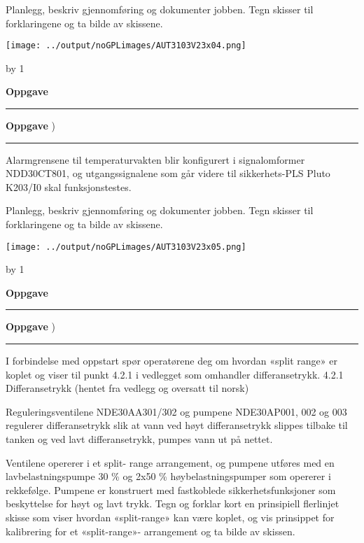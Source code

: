 \documentclass[12pt,a4paper]{article}
\def\oppgave{
            \advance\questnum by 1
	    \ifthenelse{\questnum>0\AND \questnum<9}
	    {
                \vskip 1cm
		\textbf{Oppgave}\hskip 5pt\the\questnum \hfill \hfill
		\vskip 3pt
		\hrule
	\vskip 0.5cm}
	{
                \vskip 1cm
		\textbf{Oppgave}\hskip 5pt \the\questnum \hfill \hfill)
		\vskip 3pt \hrule \vskip 0.5cm }

		}
\begin{document}
\vskip 0.25cm
Planlegg, beskriv gjennomføring og dokumenter jobben. Tegn skisser til forklaringene og ta bilde av skissene.


\vskip 0.25cm
\texttt{[image: ../output/noGPLimages/AUT3103V23x04.png]}\\
\newpage
\oppgave{}%
Alarmgrensene til temperaturvakten blir konfigurert i signalomformer NDD30CT801, og utgangssignalene som går videre til sikkerhets-PLS Pluto K203/I0 skal funksjonstestes. 

\vskip 0.25cm
Planlegg, beskriv gjennomføring og dokumenter jobben. Tegn skisser til forklaringene og ta bilde av skissene.


\vskip 0.25cm
\texttt{[image: ../output/noGPLimages/AUT3103V23x05.png]}\\
\newpage
\oppgave{}%
I forbindelse med oppstart spør operatørene deg om hvordan «split range» er koplet og viser til punkt 4.2.1 i vedlegget som omhandler differansetrykk.
\vskip 0.25cm
4.2.1 Differansetrykk (hentet fra vedlegg og oversatt til norsk)

\vskip 0.25cm
Reguleringsventilene NDE30AA301/302 og pumpene NDE30AP001, 002 og 003 regulerer differansetrykk slik at vann ved høyt differansetrykk slippes tilbake til tanken og ved lavt differansetrykk, pumpes vann ut på nettet.

\vskip 0.25cm
Ventilene opererer i et split- range arrangement, og pumpene utføres med en lavbelastningspumpe 30 \% og 2x50 \% høybelastningspumper som opererer i rekkefølge.
\vskip 0.25cm
Pumpene er konstruert med fastkoblede sikkerhetsfunksjoner som beskyttelse for høyt og lavt trykk.
\vskip 0.25cm
Tegn og forklar kort en prinsipiell flerlinjet skisse som viser hvordan «split-range» kan være koplet, og vis prinsippet for kalibrering for et «split-range»- arrangement og ta bilde av skissen. 
\vskip 0.25cm


\vskip 0.25cm
\newpage
\end{document}
